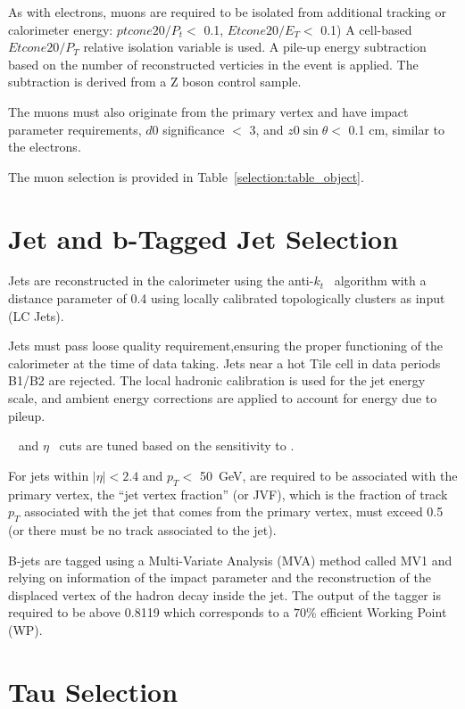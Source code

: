 As with electrons, muons are required to be isolated from 
additional tracking or calorimeter energy: $ptcone20/P_t <$ 0.1, $Etcone20/E_T <$ 0.1) A cell-based $Etcone20/P_T$ relative
isolation variable is used. A pile-up energy subtraction based 
on the number of reconstructed verticies in the event is applied. The
subtraction is derived from a Z boson control sample.


The muons must also originate from the primary vertex and have impact parameter requirements, $d0$ significance $<$ 3, and $z0\sin{\theta} <$ 0.1 cm, similar to the electrons. 


The muon selection is provided in Table~\ref{selection:table_object}. 

\section{Jet and b-Tagged Jet Selection}

Jets are reconstructed in the calorimeter using the anti-$k_t$~\cite{Cacciari:2008gp} algorithm
with a distance parameter of 0.4 using locally calibrated
topologically clusters as input (LC Jets). 

Jets must pass loose quality requirement,ensuring the proper
functioning of the calorimeter at the time of data taking. Jets near a hot Tile cell in data periods
B1/B2 are rejected. The local hadronic calibration is used for
the jet energy scale, and ambient energy corrections are applied to account
for energy due to pileup.

\pt~ and $\eta$~ cuts are tuned based on the sensitivity to \tth. 

For jets within $|\eta| < 2.4$ and $p_T <$ 50~GeV, are required to be
associated with the primary vertex, the ``jet vertex fraction'' (or JVF),
which is the fraction of track $p_T$ associated with the jet that comes from the primary vertex,
must exceed 0.5 (or there must be no track associated to the jet). 

B-jets are tagged using a Multi-Variate Analysis (MVA) method called MV1 and relying on information
of the impact parameter and the reconstruction of the displaced vertex of the
hadron decay inside the jet.%
The output of the tagger is required to be above 0.8119 which corresponds to a $70\%$ efficient Working Point (WP).

\section{Tau Selection} 

